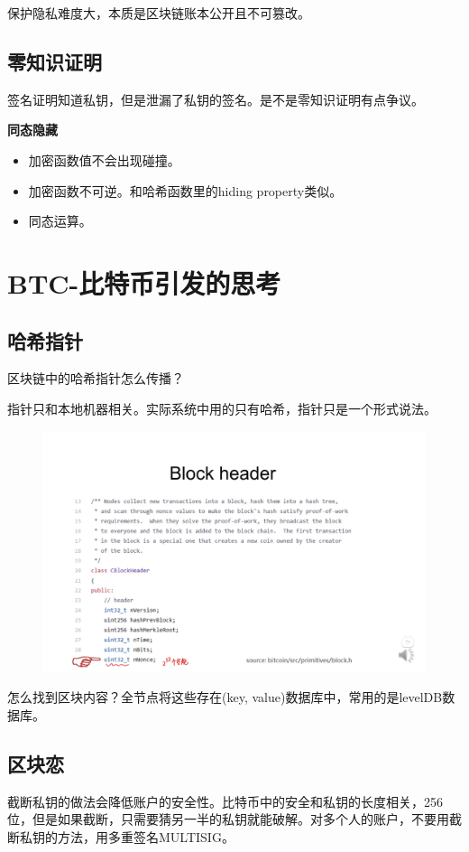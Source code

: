 \documentclass[10pt]{ctexart}
\begin{document}
保护隐私难度大，本质是区块链账本公开且不可篡改。

\subsection{零知识证明}
签名证明知道私钥，但是泄漏了私钥的签名。是不是零知识证明有点争议。

\textbf{同态隐藏}
\begin{itemize}
    \item 加密函数值不会出现碰撞。
    \item 加密函数不可逆。和哈希函数里的hiding property类似。
    \item 同态运算。
\end{itemize}
 
\section{BTC-比特币引发的思考}
\subsection{哈希指针}
区块链中的哈希指针怎么传播？

指针只和本地机器相关。实际系统中用的只有哈希，指针只是一个形式说法。
\begin{figure}[H]
    \centering
    \includegraphics[width=1\textwidth]{./lecture13/img1.png} 
\end{figure}
 
怎么找到区块内容？全节点将这些存在(key, value)数据库中，常用的是levelDB数据库。

\subsection{区块恋}
截断私钥的做法会降低账户的安全性。比特币中的安全和私钥的长度相关，256位，但是如果截断，只需要猜另一半的私钥就能破解。对多个人的账户，不要用截断私钥的方法，用多重签名MULTISIG。
\end{document}
